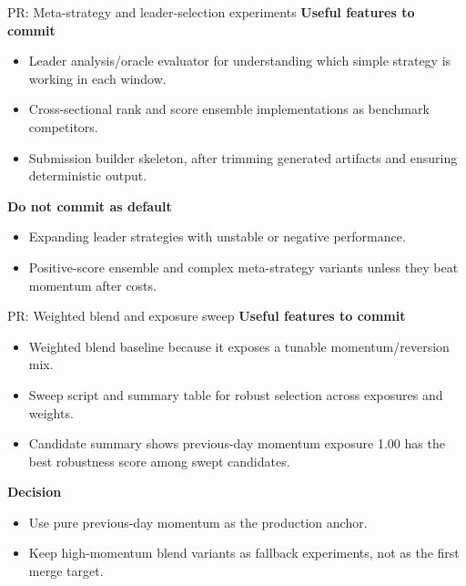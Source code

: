 \documentclass[aspectratio=169]{beamer}
\begin{document}
\begin{frame}{PR: Meta-strategy and leader-selection experiments}
\textbf{Useful features to commit}
\begin{itemize}
  \item Leader analysis/oracle evaluator for understanding which simple strategy is working in each window.
  \item Cross-sectional rank and score ensemble implementations as benchmark competitors.
  \item Submission builder skeleton, after trimming generated artifacts and ensuring deterministic output.
\end{itemize}
\textbf{Do not commit as default}
\begin{itemize}
  \item Expanding leader strategies with unstable or negative performance.
  \item Positive-score ensemble and complex meta-strategy variants unless they beat momentum after costs.
\end{itemize}
\end{frame}

\begin{frame}{PR: Weighted blend and exposure sweep}
\textbf{Useful features to commit}
\begin{itemize}
  \item Weighted blend baseline because it exposes a tunable momentum/reversion mix.
  \item Sweep script and summary table for robust selection across exposures and weights.
  \item Candidate summary shows previous-day momentum exposure 1.00 has the best robustness score among swept candidates.
\end{itemize}
\textbf{Decision}
\begin{itemize}
  \item Use pure previous-day momentum as the production anchor.
  \item Keep high-momentum blend variants as fallback experiments, not as the first merge target.
\end{itemize}
\end{frame}
\end{document}
